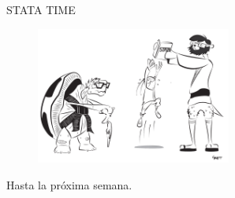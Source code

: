 \documentclass[10pt, aspectratio=169, compress]{beamer}
\begin{document}
\begin{frame}
	\begin{center}
	\LARGE STATA TIME
		\begin{figure}[H]
			\includegraphics[width=0.57\textwidth]{stata.pdf}
		\end{figure}
	\end{center}
\end{frame}
\begin{frame}
	Hasta la próxima semana.
\end{frame}
\end{document}
